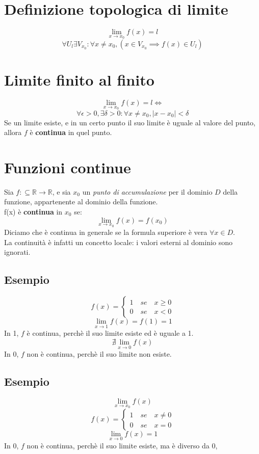 \documentclass{article}
\begin{document}
\section{Definizione topologica di limite}
\[\lim_{x \to x_0} f(x) = l\]
\[\forall U_l \exists V_{x_0} : \forall x \neq x_0, (x \in V_{x_0} \implies f(x) \in U_l)\]

\section{Limite finito al finito}
\[\lim_{x \to x_0} f(x) = l \Leftrightarrow\]
\[\forall \epsilon > 0, \exists \delta > 0 : \forall x \neq x_0, |x - x_0| < \delta\]
Se un limite esiste, e in un certo punto il suo limite è uguale al valore del punto, allora \(f\) è \textbf{continua} in quel punto.

\section{Funzioni continue}
Sia \(f : \subseteq \mathbb{R} \to \mathbb{R}\), e sia \(x_0\) un \textit{punto di accumulazione} per il dominio \(D\) della funzione, appartenente al dominio della funzione.\\
f(x) è \textbf{continua} in \(x_0\) se:
\[\lim_{x \to x_0} f(x) = f(x_0)\]
Diciamo che è continua in generale se la formula superiore è vera \(\forall x \in D\).\\
La continuità è infatti un concetto locale: i valori esterni al dominio sono ignorati.

\subsection{Esempio}
\[f(x) =
\begin{cases}
    1\quad se \quad x \geq 0\\
    0\quad se \quad x < 0
\end{cases}\]
\[\lim_{x \to 1} f(x) = f(1) = 1\]
In 1, \(f\) è continua, perchè il suo limite esiste ed è uguale a 1.
\[\nexists \lim_{x \to 0} f(x)\]
In 0, \(f\) non è continua, perchè il suo limite non esiste.

\subsection{Esempio}
\[\lim_{x \to x_0} f(x)\]
\[f(x) =
\begin{cases}
    1\quad se \quad x \neq 0\\
    0\quad se \quad x = 0
\end{cases}\]
\[\lim_{x \to 0} f(x) = 1\]
In 0, \(f\) non è continua, perchè il suo limite esiste, ma è diverso da 0,
\end{document}
